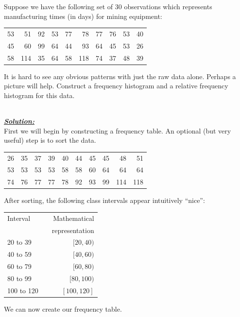 \begin{example}
Suppose we have the following set of 30 observations which represents manufacturing times (in days) for mining equipment:
\begin{center}
\begin{tabular}{r r r r r r r r r r  }
53	& 	51	&	92	&	53	&	77	&	78	&	77	&	76	&	53	&	40	\\
45	&	60	&	99 	&	64 	&	44	&	93	&	64	&	45	&	53	&	26	\\
58	&	114	&	35	&	64	&	58	&	118	&	74	&	37	&	48	&	39	
\end{tabular}
\end{center}

It is hard to see any obvious patterns with just the raw data alone. Perhaps a picture will help. 
Construct a frequency histogram and a relative frequency histogram for this data. 

\hfill\\
{\emph{\textbf{\underline{Solution:}}}}\\

First we will begin by constructing a frequency table. An optional (but very useful) step is to sort the data.
\begin{center}
\begin{tabular}{r r r r r r r r r r  }
26	&	35	&	37	&	39	&	40	&	44	&	45	&	45	&	48	&	51	\\
53	&	53	&	53	&	53	&	58	&	58	&	60	&	64	&	64	&	64	\\
74  	&	76	&	77	&	77	&	78	&	92	&	93	&	99	&	114	&	118
\end{tabular}
\end{center}

After sorting, the following class intervals appear intuitively ``nice'': 
\begin{center}
\def\arraystretch{1.15}
\begin{tabular}{lcr}
Interval	& &	Mathematical	\\
		& &	representation	\\
\hline
20 to 39		& &	$[20,40)$	\\
40 to 59		& &	$[40,60)$ 	\\
60 to 79		& &	$[60,80)$	\\
80 to 99		& &	$[80,100)$	\\
100 to 120	& &	$[100,120]$ 	\\
\hline
\end{tabular}
\end{center}

\noindent
We can now create our frequency table.


\end{example}
